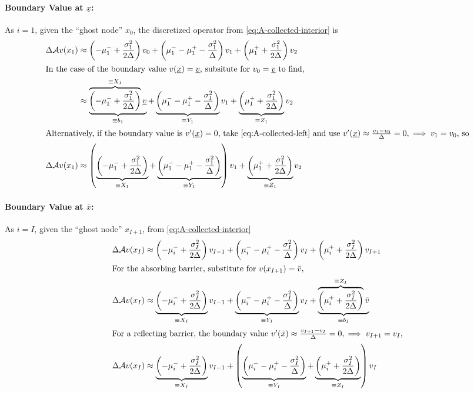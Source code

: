 \documentclass[11pt]{etk-article}
\begin{document}
\paragraph{Boundary Value at $\underline{x}$:}
As $i =1$, given the ``ghost node'' $x_0$, the discretized operator from \cref{eq:A-collected-interior} is
\begin{align}
\Delta \mathcal{A} v(x_1) &\approx \left(-\mu_1^{-} +\frac{\sigma_1^2}{2\Delta}\right)v_0 + \left(\mu_1^{-} - \mu_1^{+}-\frac{\sigma_1^2}{\Delta}\right)v_1 + \left(\mu_1^{+} + \frac{\sigma_1^2}{2\Delta}\right)v_2\label{eq:A-collected-left}\\
\intertext{In the case of the boundary value $v(\underline{x}) = \underline{v}$, subsitute for $v_0 =  \underline{v}$ to find,}
&\approx \underbrace{\overbrace{\left(-\mu_1^{-} +\frac{\sigma_1^2}{2\Delta}\right)}^{\equiv X_1}\underline{v}}_{\equiv b_1} +  \underbrace{\left(\mu_1^{-} - \mu_1^{+}-\frac{\sigma_1^2}{\Delta}\right)}_{\equiv Y_1}v_1 + \underbrace{\left(\mu_1^{+} + \frac{\sigma_1^2}{2\Delta}\right)}_{\equiv Z_1}v_2\\
\intertext{Alternatively, if the boundary value is $v'(\underline{x}) = 0$, take \cref{eq:A-collected-left} and use $v'(\underline{x}) \approx \frac{v_1-v_0}{\Delta} = 0, \implies v_1 = v_0$, so}
\Delta \mathcal{A} v(x_1) &\approx \left(\underbrace{\left(-\mu_1^{-} +\frac{\sigma_1^2}{2\Delta}\right)}_{\equiv X_1} + \underbrace{\left(\mu_1^{-} - \mu_1^{+}-\frac{\sigma_1^2}{\Delta}\right)}_{\equiv Y_1}\right)v_1 + \underbrace{\left(\mu_1^{+} + \frac{\sigma_1^2}{2\Delta}\right)}_{\equiv Z_1}v_2
\end{align}

\paragraph{Boundary Value at $\bar{x}$:}
As $i=I$, given the ``ghost node'' $x_{I+1}$, from \cref{eq:A-collected-interior}
\begin{align}
\Delta \mathcal{A} v(x_I)&\approx \left(-\mu_i^{-} +\frac{\sigma_I^2}{2\Delta}\right)v_{I-1} + \left(\mu_i^{-} - \mu_i^{+}-\frac{\sigma_I^2}{\Delta}\right)v_I + \left(\mu_i^{+} + \frac{\sigma_I^2}{2\Delta}\right)v_{I+1}\\
\intertext{For the absorbing barrier, substitute for $v(x_{I+1}) = \bar{v}$,}
\Delta \mathcal{A} v(x_I)&\approx \underbrace{\left(-\mu_i^{-} +\frac{\sigma_I^2}{2\Delta}\right)}_{\equiv X_I} v_{I-1} + \underbrace{\left(\mu_i^{-} - \mu_i^{+}-\frac{\sigma_I^2}{\Delta}\right)}_{\equiv Y_I} v_I + \underbrace{\overbrace{\left(\mu_i^{+} + \frac{\sigma_I^2}{2\Delta}\right)}^{\equiv Z_I}\bar{v}}_{\equiv b_I}\\
\intertext{For a reflecting barrier, the boundary value $v'(\bar{x}) \approx \frac{v_{I+1}-v_I}{\Delta} = 0, \implies v_{I+1} = v_I$,}
\Delta \mathcal{A} v(x_I)&\approx \underbrace{\left(-\mu_i^{-} +\frac{\sigma_I^2}{2\Delta}\right)}_{\equiv X_I} v_{I-1} + \left(\underbrace{\left(\mu_i^{-} - \mu_i^{+}-\frac{\sigma_I^2}{\Delta}\right)}_{\equiv Y_I} + \underbrace{\left(\mu_i^{+} + \frac{\sigma_I^2}{2\Delta}\right)}_{\equiv Z_I} \right) v_I 
\end{align}
\end{document}
